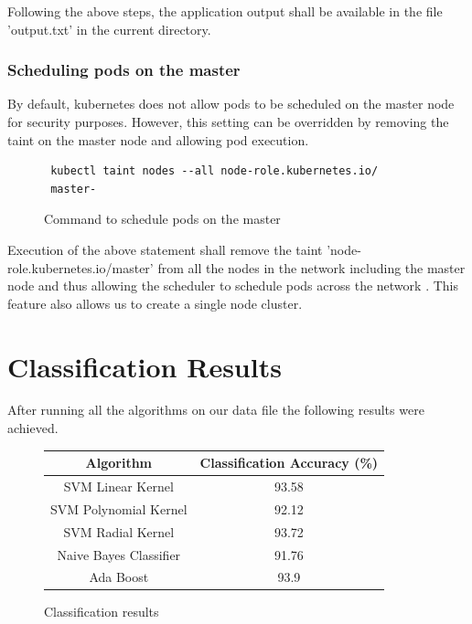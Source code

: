 \documentclass[9pt,twocolumn,twoside]{../../styles/osajnl}
\begin{document}
Following the above steps, the application output shall be available
in the file 'output.txt' in the current directory.


\subsubsection{Scheduling pods on the master}
By default, kubernetes does not allow pods to be
scheduled on the master node for security purposes. However, this
setting can be overridden by removing the taint on the master node and
allowing pod execution.
\begin{figure}[H]
\begin{verbatim}
 kubectl taint nodes --all node-role.kubernetes.io/
 master-
\end{verbatim}
\caption{Command to schedule pods on the master}
\vspace{-4mm}
\label{Command to schedule pods on the master}
\end{figure}

Execution of the above statement shall remove the taint
'node-role.kubernetes.io/master' from all the nodes in the network
including the master node and thus allowing the scheduler to schedule
pods across the network \cite{www-kubernetes-kubeadm}. This feature
also allows us to create a single node cluster.

\section{Classification Results}

After running all the algorithms on our data file the following
results were achieved.

\begin{figure}[ht]
\begin{center}
 \begin{tabular}{|c | c|} 
 \hline
Algorithm  & Classification Accuracy (\%) \\ [0.5ex] 
 \hline\hline
    
SVM Linear Kernel & 93.58 \\
\hline

SVM Polynomial Kernel & 92.12 \\
\hline

SVM Radial Kernel & 93.72 \\[1ex]
\hline

Naive Bayes Classifier & 91.76 \\[1ex]

\hline
Ada Boost  & 93.9 \\[1ex]
\hline

\end{tabular}
\end{center}
  \caption{Classification results}
\end{figure}
\end{document}
